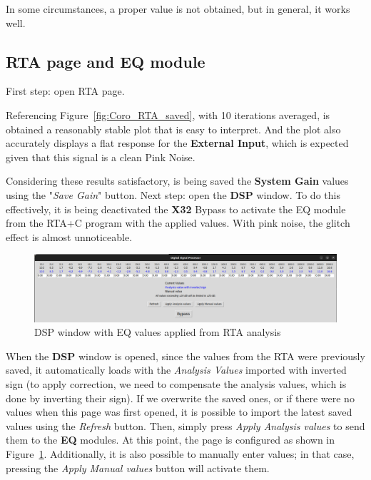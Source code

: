 In some circumstances, a proper value is not obtained, but in general, it works well.


\subsection{RTA page and EQ module}

First step: open RTA page.

Referencing Figure~\ref{fig:Coro_RTA_saved}, with 10 iterations averaged, is obtained a reasonably stable plot that is easy to interpret. And the plot also accurately displays a flat response for the \textbf{External Input}, which is expected given that this signal is a clean Pink Noise.

Considering these results satisfactory, is being saved the \textbf{System Gain} values using the "\textit{Save Gain}" button. Next step: open the \textbf{DSP} window. To do this effectively, it is being deactivated the \textbf{X32} Bypass to activate the EQ module from the RTA+C program with the applied values. With pink noise, the glitch effect is almost unnoticeable.

\begin{figure}[H]
	\centering
	\includegraphics[width=1
	\linewidth]{Figures/Coro_EQ_from_RTA.png}
	\caption{DSP window with EQ values applied from RTA analysis}
	\label{fig:Coro_EQ_RTA+C}
\end{figure}

When the \textbf{DSP} window is opened, since the values from the RTA were previously saved, it automatically loads with the \textit{Analysis Values} imported with inverted sign (to apply correction, we need to compensate the analysis values, which is done by inverting their sign). If we overwrite the saved ones, or if there were no values when this page was first opened, it is possible to import the latest saved values using the \textit{Refresh} button. Then, simply press \textit{Apply Analysis values} to send them to the \textbf{EQ} modules. At this point, the page is configured as shown in Figure~\ref{fig:Coro_EQ_RTA+C}. Additionally, it is also possible to manually enter values; in that case, pressing the \textit{Apply Manual values} button will activate them.

